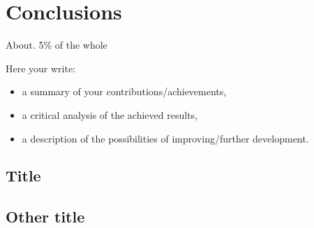 \documentclass[12pt,a4paper,twoside]{report}
\begin{document}
\chapter{Conclusions}

About. 5\% of the whole

Here your write:
\begin{itemize}
\item a summary of your contributions/achievements,
\item a critical analysis of the achieved results,
\item a description of the possibilities of improving/further development.
\end{itemize}
\section{Title}
\section{Other title}


 


\end{document}
